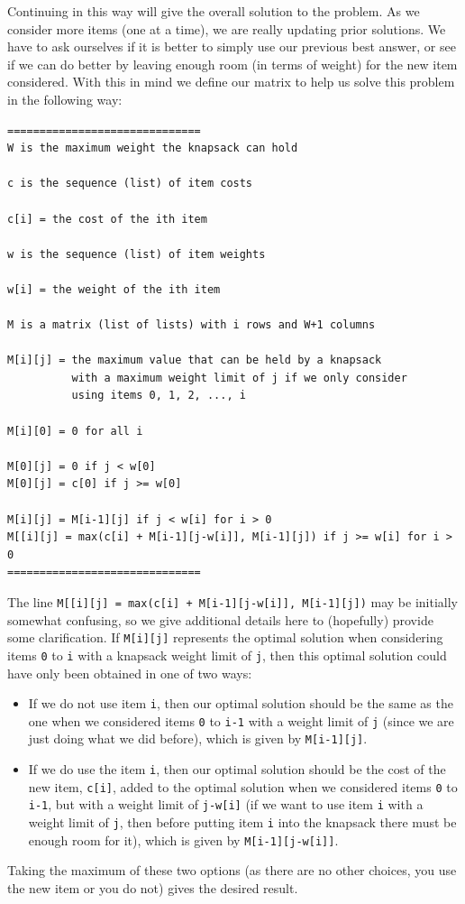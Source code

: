 \documentclass{ximera}
\begin{document}
Continuing in this way will give the overall solution to the problem. As we consider more items (one at a time), we are really updating prior solutions. We have to ask ourselves if it is better to simply use our previous best answer, or see if we can do better by leaving enough room (in terms of weight) for the new item considered. With this in mind we define our matrix to help us solve this problem in the following way:

\begin{verbatim}
==============================
W is the maximum weight the knapsack can hold

c is the sequence (list) of item costs

c[i] = the cost of the ith item

w is the sequence (list) of item weights

w[i] = the weight of the ith item

M is a matrix (list of lists) with i rows and W+1 columns

M[i][j] = the maximum value that can be held by a knapsack
          with a maximum weight limit of j if we only consider
          using items 0, 1, 2, ..., i

M[i][0] = 0 for all i

M[0][j] = 0 if j < w[0]
M[0][j] = c[0] if j >= w[0]

M[i][j] = M[i-1][j] if j < w[i] for i > 0
M[[i][j] = max(c[i] + M[i-1][j-w[i]], M[i-1][j]) if j >= w[i] for i > 0
==============================
\end{verbatim}
The line \verb|M[[i][j] = max(c[i] + M[i-1][j-w[i]], M[i-1][j])| may be initially somewhat confusing, so we give additional details here to (hopefully) provide some clarification. If \verb|M[i][j]| represents the optimal solution when considering items \verb|0| to \verb|i| with a knapsack weight limit of \verb|j|, then this optimal solution could have only been obtained in one of two ways:
\begin{itemize}
	\item If we do not use item \verb|i|, then our optimal solution should be the same as the one when we considered items \verb|0| to \verb|i-1| with a weight limit of \verb|j| (since we are just doing what we did before), which is given by \verb|M[i-1][j]|.
	\item If we do use the item \verb|i|, then our optimal solution should be the cost of the new item, \verb|c[i]|, added to the optimal solution when we considered items \verb|0| to \verb|i-1|, but with a weight limit of \verb|j-w[i]| (if we want to use item \verb|i| with a weight limit of \verb|j|, then before putting item \verb|i| into the knapsack there must be enough room for it), which is given by \verb|M[i-1][j-w[i]]|.
\end{itemize}
Taking the maximum of these two options (as there are no other choices, you use the new item or you do not) gives the desired result.
\end{document}
